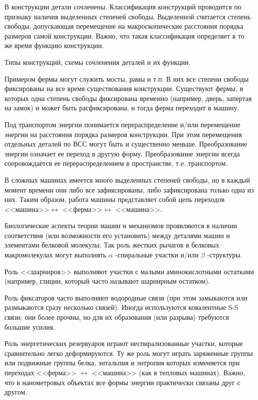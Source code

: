 \documentclass[12pt,a4paper,oneside]{book}
\begin{document}
В конструкции детали сочленены. Классификация конструкций проводится по признаку наличия выделенных степеней свободы. Выделенной считается степень свободы, допускающая перемещение на макроскопические расстояния порядка размеров самой конструкции. Важно, что такая классификация определяет в то же время функцию конструкции. 

Типы конструкций, схемы сочленения деталей и их функции. 

Примером фермы могут служить мосты, рамы и т.п. В них все степени свободы фиксированы на все время существования конструкции. Существуют фермы, в которых одна степень свободы фиксирована временно (например, дверь, запертая на замок) и может быть расфиксирована, и тогда ферма переходит в машину.

Под транспортом энергии понимается перераспределение и/или перемещение энергии на расстояния порядка размеров конструкции. При этом перемещения отдельных деталей по ВСС могут быть и существенно меньше. Преобразование энергии означает ее переход в другую форму. Преобразование энергии всегда сопровождается ее перераспределением в пространстве, т.е. транспортом. 

В сложных машинах имеется много выделенных степеней свободы, но в каждый момент времени они либо все зафиксированы, либо зафиксирована только одна из них. Таким образом, работа машины представляет собой цепь переходов <<машина>>$\leftrightarrow$ <<ферма>>$\leftrightarrow$ <<машина>>.

Биологические аспекты теории машин и механизмов проявляются в наличии соответствия (или возможности его установить) между деталями машин и элементами белковой молекулы. Так роль жестких рычагов в белковых макромолекулах могут выполнять $\alpha$ -спиральные участки и/или $\beta$ -структуры.

Роль <<шарниров>> выполняют участки с малыми аминокислотными  остатками (например, глицин, который часто называют шарнирным остатком).

Роль фиксаторов часто выполняют водородные связи (при этом замыкаются или размыкаются сразу несколько связей). Иногда используются ковалентные S-S связи; они более прочны, но для их образования (или разрыва) требуются большие усилия. 

Роль энергетических резервуаров играют неспирализованные участки, которые сравнительно легко деформируются. Ту же роль могут играть заряженные группы или  подвижные группы белка, энтальпия и энтропия которых изменяется при переходах <<ферма>> $\leftrightarrow$ <<машина>> (как в тепловых машинах). Важно, что в нанометровых объектах все формы энергии практически связаны друг с другом. 
\end{document}
